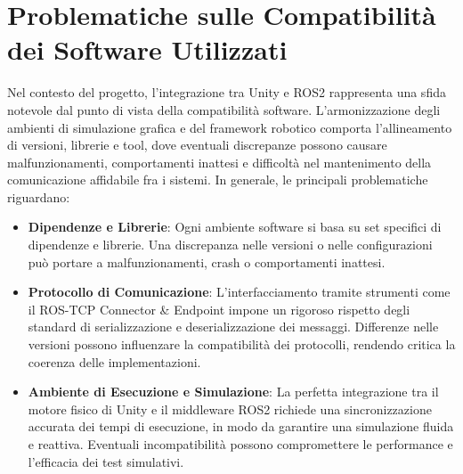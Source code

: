 \documentclass[11pt]{report}
\begin{document}
\section{Problematiche sulle Compatibilità dei Software Utilizzati}
\label{sec:Problemi_Compatibilità}
Nel contesto del progetto, l’integrazione tra Unity e ROS2 rappresenta una sfida notevole dal punto di vista della compatibilità software. L’armonizzazione degli ambienti di simulazione grafica e del framework robotico comporta l’allineamento di versioni, librerie e tool, dove eventuali discrepanze possono causare malfunzionamenti, comportamenti inattesi e difficoltà nel mantenimento della comunicazione affidabile fra i sistemi. In generale, le principali problematiche riguardano:
\begin{itemize}
    \item \textbf{Dipendenze e Librerie}: Ogni ambiente software si basa su set specifici di dipendenze e librerie. Una discrepanza nelle versioni o nelle configurazioni può portare a malfunzionamenti, crash o comportamenti inattesi.

    \item \textbf{Protocollo di Comunicazione}: L’interfacciamento tramite strumenti come il ROS-TCP Connector \& Endpoint impone un rigoroso rispetto degli standard di serializzazione e deserializzazione dei messaggi. Differenze nelle versioni possono influenzare la compatibilità dei protocolli, rendendo critica la coerenza delle implementazioni.
    
    \item \textbf{Ambiente di Esecuzione e Simulazione}: La perfetta integrazione tra il motore fisico di Unity e il middleware ROS2 richiede una sincronizzazione accurata dei tempi di esecuzione, in modo da garantire una simulazione fluida e reattiva. Eventuali incompatibilità possono compromettere le performance e l’efficacia dei test simulativi.
\end{itemize}
\end{document}
